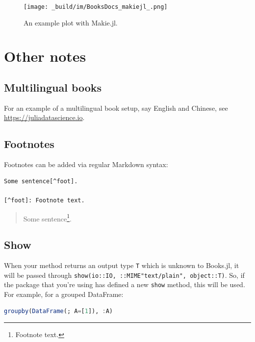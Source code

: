 \documentclass[
  notoc %
]{tufte-book}
\newcommand{\passthrough}[1]{#1}
\begin{document}
\begin{figure}
\hypertarget{fig:makie}{%
\centering
\texttt{[image: \_build/im/BooksDocs\_makiejl\_.png]}
\caption{An example plot with Makie.jl.}\label{fig:makie}
}
\end{figure}

\hypertarget{other-notes}{%
\section{Other notes}\label{other-notes}}

\hypertarget{multilingual-books}{%
\subsection{Multilingual books}\label{multilingual-books}}

For an example of a multilingual book setup, say English and Chinese,
see \url{https://juliadatascience.io}.

\hypertarget{footnotes}{%
\subsection{Footnotes}\label{footnotes}}

Footnotes can be added via regular Markdown syntax:

\begin{lstlisting}
Some sentence[^foot].

[^foot]: Footnote text.
\end{lstlisting}

\begin{quote}
Some sentence\footnote{Footnote text.}.
\end{quote}

\hypertarget{show}{%
\subsection{Show}\label{show}}

When your method returns an output type \passthrough{\lstinline!T!}
which is unknown to Books.jl, it will be passed through
\passthrough{\lstinline!show(io::IO, ::MIME"text/plain", object::T)!}.
So, if the package that you're using has defined a new
\passthrough{\lstinline!show!} method, this will be used. For example,
for a grouped DataFrame:

\begin{lstlisting}[language=Julia]
groupby(DataFrame(; A=[1]), :A)
\end{lstlisting}
\end{document}

